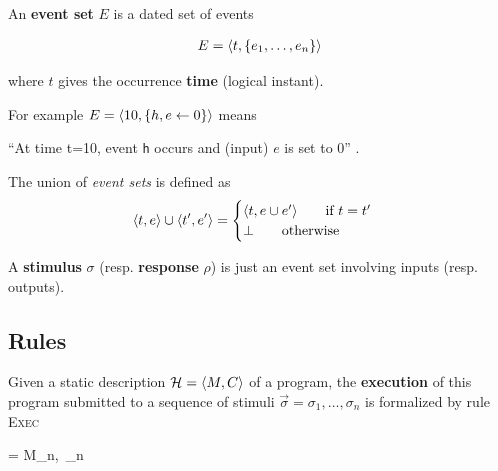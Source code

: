 \medskip
\step An \textbf{event set} $E$ is a dated set of events

\begin{eqnarray*}
  E = \langle t, \{e_1,\ldots,e_n\}\rangle
\end{eqnarray*}

where $t$ gives the occurrence \textbf{time} (logical instant).

\medskip
For example $E=\langle10, \{h,e \gets 0\}\rangle$ means

\begin{center}
``At time t=10, event \texttt{h} occurs and (input) $e$ is set to 0'' .
\end{center}

\medskip
The union of \emph{event sets} is defined as
  \begin{eqnarray*}
    \langle t, e\rangle \cup \langle t', e'\rangle =
    \begin{cases}
      \langle t, e \cup e'\rangle \qquad \text{if}\ t=t' \\
      \bot\qquad \text{otherwise}
    \end{cases}
  \end{eqnarray*}

\medskip\step A \textbf{stimulus} $\sigma$ (resp. \textbf{response} $\rho$) is just an event set involving inputs
  (resp. outputs).



\subsection*{Rules}
\label{sec:dynsem-rules}

\step
Given a static description $\mathcal{H}=\langle M, C\rangle$ of a program, the \textbf{execution} of this
program submitted to a sequence of stimuli $\vec{\sigma}=\sigma_1,\ldots,\sigma_n$ is formalized by
rule \textsc{Exec} 


{= \xrightarrow[\vec{\rho}=\sequn{\rho}]{\vec{\sigma}=\sequn{\sigma}} M_n,\ \env_n}

